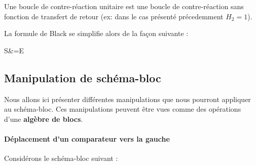 Une boucle de contre-réaction unitaire est une boucle de contre-réaction sans 
fonction de transfert de retour (ex: dans le cas présenté précedemment $H_2=1$).

\begin{center}
\end{center}

La formule de Black se simplifie alors de la façon suivante :
\begin{bequation}
    S&=E
\end{bequation}

\subsection{Manipulation de schéma-bloc}
Nous allons ici présenter différentes manipulations que nous
pourront appliquer au schéma-bloc. Ces manipulations peuvent
être vues comme des opérations d'une \textbf{algèbre de blocs}.

\paragraph{Déplacement d'un comparateur vers la gauche}

Considérons le schéma-bloc suivant :
\begin{center}
\end{center}


